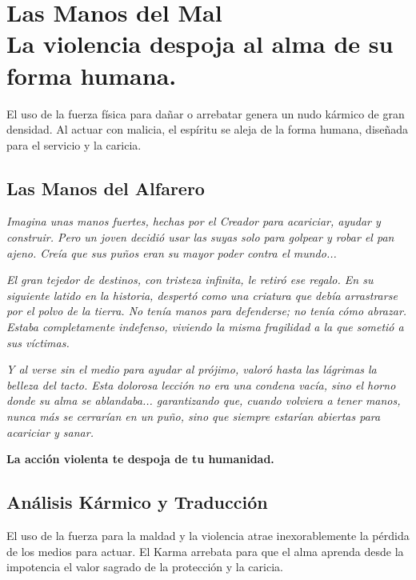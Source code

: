 \chapter[Las Manos del Mal]{Las Manos del Mal\\ \large La violencia despoja al alma de su forma humana.}


\lettrine[lines=3, nindent=0.5em, findent=0.2em]{E}{}l uso de la fuerza física para dañar o arrebatar genera un nudo kármico de gran densidad. Al actuar con malicia, el espíritu se aleja de la forma humana, diseñada para el servicio y la caricia.

\section{Las Manos del Alfarero}
\begin{elegantquote}
\textit{Imagina unas manos fuertes, hechas por el Creador para acariciar, ayudar y construir. Pero un joven decidió usar las suyas solo para golpear y robar el pan ajeno. Creía que sus puños eran su mayor poder contra el mundo...}

\textit{El gran tejedor de destinos, con tristeza infinita, le retiró ese regalo. En su siguiente latido en la historia, despertó como una criatura que debía arrastrarse por el polvo de la tierra. No tenía manos para defenderse; no tenía cómo abrazar. Estaba completamente indefenso, viviendo la misma fragilidad a la que sometió a sus víctimas.}

\textit{Y al verse sin el medio para ayudar al prójimo, valoró hasta las lágrimas la belleza del tacto. Esta dolorosa lección no era una condena vacía, sino el horno donde su alma se ablandaba... garantizando que, cuando volviera a tener manos, nunca más se cerrarían en un puño, sino que siempre estarían abiertas para acariciar y sanar.}

\end{elegantquote}

\vspace{1em}
\begin{center}
    \textbf{\Large La acción violenta te despoja de tu humanidad.}
\end{center}
\vspace{1em}

\section{Análisis Kármico y Traducción}
\begin{figure}
  \vspace{-1.5em}
  \begin{center}
  \end{center}
  \vspace{-1.5em}
\end{figure}
El uso de la fuerza para la maldad y la violencia atrae inexorablemente la pérdida de los medios para actuar. El Karma arrebata para que el alma aprenda desde la impotencia el valor sagrado de la protección y la caricia.

